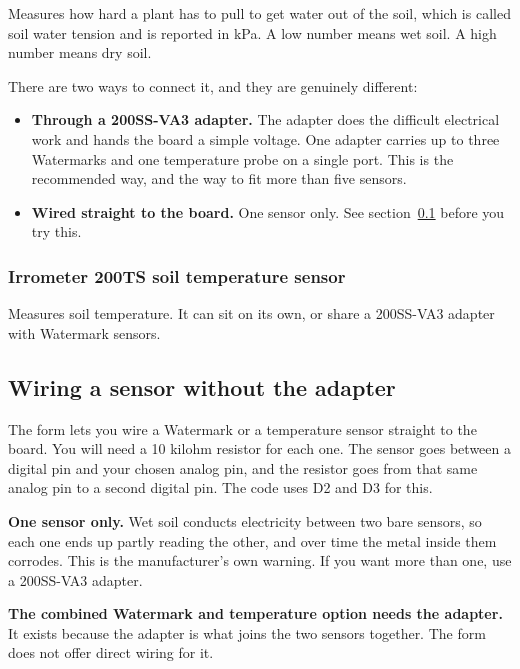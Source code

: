 \documentclass[11pt,a4paper]{article}
\newenvironment{caution}
  {\par\medskip\noindent
   \begin{lrbox}{\nfbox}\begin{minipage}{0.94\linewidth}\vspace{2pt}}
  {\vspace{2pt}\end{minipage}\end{lrbox}%
   \fcolorbox{warn}{white}{\usebox{\nfbox}}\par\medskip}
\begin{document}
Measures how hard a plant has to pull to get water out of the soil, which is
called soil water tension and is reported in kPa. A low number means wet soil.
A high number means dry soil.

There are two ways to connect it, and they are genuinely different:

\begin{itemize}
  \item \textbf{Through a 200SS-VA3 adapter.} The adapter does the difficult
        electrical work and hands the board a simple voltage. One adapter
        carries up to three Watermarks and one temperature probe on a single
        port. This is the recommended way, and the way to fit more than five
        sensors.
  \item \textbf{Wired straight to the board.} One sensor only. See
        section~\ref{sec:direct} before you try this.
\end{itemize}

\subsubsection*{Irrometer 200TS soil temperature sensor}

Measures soil temperature. It can sit on its own, or share a 200SS-VA3 adapter
with Watermark sensors.

\subsection{Wiring a sensor without the adapter}
\label{sec:direct}

The form lets you wire a Watermark or a temperature sensor straight to the
board. You will need a 10 kilohm resistor for each one. The sensor goes between
a digital pin and your chosen analog pin, and the resistor goes from that same
analog pin to a second digital pin. The code uses D2 and D3 for this.

\begin{caution}
\textbf{One sensor only.} Wet soil conducts electricity between two bare
sensors, so each one ends up partly reading the other, and over time the metal
inside them corrodes. This is the manufacturer's own warning. If you want more
than one, use a 200SS-VA3 adapter.
\end{caution}

\begin{caution}
\textbf{The combined Watermark and temperature option needs the adapter.} It
exists because the adapter is what joins the two sensors together. The form
does not offer direct wiring for it.
\end{caution}
\end{document}
